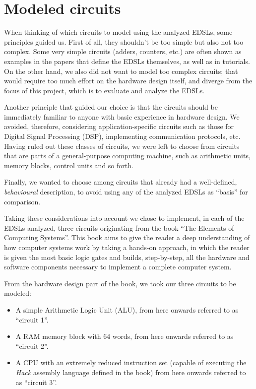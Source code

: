 \section{Modeled circuits}
\label{sec:circuits}

    When thinking of which circuits to model using the analyzed \acp{EDSL}, some principles guided us.
    First of all, they shouldn't be too simple but also not too complex. Some very simple circuits
    (adders, counters, etc.) are often shown as examples in the papers that define the \acp{EDSL}
    themselves, as well as in tutorials. On the other hand, we also did not want to model too
    complex circuits; that would require too much effort on the hardware design itself, and diverge
    from the focus of this project, which is to evaluate and analyze the \acp{EDSL}.

    Another principle that guided our choice is that the circuits should be immediately familiar to
    anyone with basic experience in hardware design. We avoided, therefore, considering
    application-specific circuits such as those for Digital Signal Processing (DSP), implementing
    communication protocols, etc. Having ruled out these classes of circuits, we were left to choose
    from circuits that are parts of a general-purpose computing machine, such as arithmetic units,
    memory blocks, control units and so forth.

    Finally, we wanted to choose among circuits that already had a well-defined, \emph{behavioural}
    description, to avoid using any of the analyzed \acp{EDSL} as ``basis'' for comparison.

    Taking these considerations into account we chose to implement, in each of the \acp{EDSL} analyzed,
    three circuits originating from the book ``The Elements of Computing
    Systems''\cite{nand2tetris-book}. This book aims to give the reader a deep understanding of how
    computer systems work by taking a hands-on approach, in which the reader is given the most basic
    logic gates and builds, step-by-step, all the hardware and software components necessary to
    implement a complete computer system.

    From the hardware design part of the book, we took our three circuits to be modeled:

    \begin{itemize}
        \item A simple Arithmetic Logic Unit (ALU), from here onwards referred to as ``circuit 1''.

        \item A RAM memory block with 64 words, from here onwards referred to as ``circuit 2''.

        \item A CPU with an extremely reduced instruction set (capable of executing the \emph{Hack}
            assembly language defined in the book) from here onwards referred to as ``circuit 3''.
    \end{itemize}

